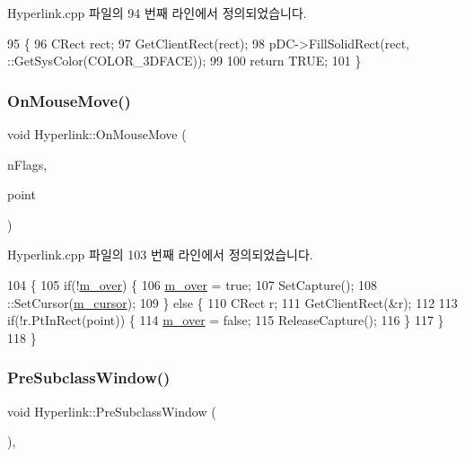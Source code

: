 Hyperlink.\+cpp 파일의 94 번째 라인에서 정의되었습니다.


\begin{DoxyCode}
95 \{
96   CRect rect;
97   GetClientRect(rect);
98   pDC->FillSolidRect(rect, ::GetSysColor(COLOR\_3DFACE));
99 
100   \textcolor{keywordflow}{return} TRUE;
101 \}
\end{DoxyCode}
\mbox{\label{class_hyperlink_a72fe2dbc81212528289454a7d13393c6}} 
\subsubsection{\texorpdfstring{On\+Mouse\+Move()}{OnMouseMove()}}
{\footnotesize\ttfamily void Hyperlink\+::\+On\+Mouse\+Move (\begin{DoxyParamCaption}\item[{U\+I\+NT}]{n\+Flags,  }\item[{C\+Point}]{point }\end{DoxyParamCaption})\hspace{0.3cm}{\ttfamily [protected]}}



Hyperlink.\+cpp 파일의 103 번째 라인에서 정의되었습니다.


\begin{DoxyCode}
104 \{
105   \textcolor{keywordflow}{if}(!\mbox{\hyperlink{class_hyperlink_a78f23c373fa8a3e7deb0cd9e0f8100f4}{m\_over}}) \{
106     \mbox{\hyperlink{class_hyperlink_a78f23c373fa8a3e7deb0cd9e0f8100f4}{m\_over}} = \textcolor{keyword}{true};
107     SetCapture();
108     ::SetCursor(\mbox{\hyperlink{class_hyperlink_a1caebeaeff16f7e5cf3a15718490b0c6}{m\_cursor}});
109   \} \textcolor{keywordflow}{else} \{
110     CRect r;
111     GetClientRect(&r);
112 
113     \textcolor{keywordflow}{if}(!r.PtInRect(point)) \{
114       \mbox{\hyperlink{class_hyperlink_a78f23c373fa8a3e7deb0cd9e0f8100f4}{m\_over}} = \textcolor{keyword}{false};
115       ReleaseCapture();
116     \}
117   \}
118 \}
\end{DoxyCode}
\mbox{\label{class_hyperlink_a8825e770ef8eaebc598f887f8344b03a}} 
\subsubsection{\texorpdfstring{Pre\+Subclass\+Window()}{PreSubclassWindow()}}
{\footnotesize\ttfamily void Hyperlink\+::\+Pre\+Subclass\+Window (\begin{DoxyParamCaption}{ }\end{DoxyParamCaption})\hspace{0.3cm}{\ttfamily [protected]}, {\ttfamily [virtual]}}



